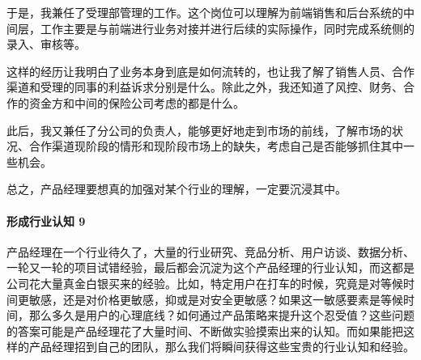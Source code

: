 \documentclass[letterpaper,10pt,english]{sphinxmanual}
\begin{document}
于是，我兼任了受理部管理的工作。这个岗位可以理解为前端销售和后台系统的中间层，工作主要是与前端进行业务对接并进行后续的实际操作，同时完成系统侧的录入、审核等。

这样的经历让我明白了业务本身到底是如何流转的，也让我了解了销售人员、合作渠道和受理的同事的利益诉求分别是什么。除此之外，我还知道了风控、财务、合作的资金方和中间的保险公司考虑的都是什么。

此后，我又兼任了分公司的负责人，能够更好地走到市场的前线，了解市场的状况、合作渠道现阶段的情形和现阶段市场上的缺失，考虑自己是否能够抓住其中一些机会。

总之，产品经理要想真的加强对某个行业的理解，一定要沉浸其中。


\paragraph{形成行业认知 9\sphinxfootnotemark[513]}
\label{\detokenize{chapter_knowledge/industry_analysis:id23}}%
\begin{footnotetext}[513]\sphinxAtStartFootnote
{}
%
\end{footnotetext}\ignorespaces 
产品经理在一个行业待久了，大量的行业研究、竞品分析、用户访谈、数据分析、一轮又一轮的项目试错经验，最后都会沉淀为这个产品经理的行业认知，而这都是公司花大量真金白银买来的经验。比如，特定用户在打车的时候，究竟是对等候时间更敏感，还是对价格更敏感，抑或是对安全更敏感？如果这一敏感要素是等候时间，那么多久是用户的心理底线？如何通过产品策略来提升这个忍受值？这些问题的答案可能是产品经理花了大量时间、不断做实验摸索出来的认知。而如果能把这样的产品经理招到自己的团队，那么我们将瞬间获得这些宝贵的行业认知和经验。
\end{document}
